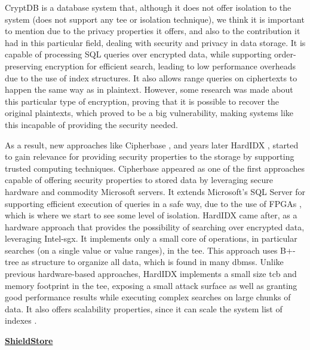 CryptDB \cite{cryptDBPaper} is a database system that, although it does not offer isolation to the system (does not support any \gls{tee} or isolation technique), we think it is important to mention due to the privacy properties it offers, and also to the contribution it had in this particular field, dealing with security and privacy in data storage.
It is capable of processing SQL queries over encrypted data, while supporting order-preserving encryption for efficient search, leading to low performance overheads due to the use of index structures. It also allows range queries on ciphertexts to happen the same way as in plaintext. However, some research  \cite{naveedPaper} was made about this particular type of encryption, proving that it is possible to recover the original plaintexts, which proved to be a big vulnerability, making systems like this incapable of providing the security needed.

As a result, new approaches like Cipherbase \cite{cipherbasePaper}, and years later HardIDX \cite{hardIDXPaper}, started to gain relevance for providing security properties to the storage by supporting trusted computing techniques.
Cipherbase appeared as one of the first approaches capable of offering security properties to stored data by leveraging secure hardware and commodity Microsoft servers. It extends Microsoft's SQL Server for supporting efficient execution of queries in a safe way, due to the use of FPGAs \cite{fpga}, which is where we start to see some level of isolation.
HardIDX came after, as a hardware approach that provides the possibility of searching over encrypted data, leveraging Intel-\gls{sgx}. It implements only a small core of operations, in particular searches (on a single value or value ranges), in the \gls{tee}.
This approach uses B+-tree as structure to organize all data, which is found in many \gls{dbms}s.
Unlike previous hardware-based approaches, HardIDX implements a small size \gls{tcb} and memory footprint in the \gls{tee}, exposing a small attack surface as well as granting good performance results while executing complex searches on large chunks of data. It also offers scalability properties, since it can scale the system list of indexes \cite{hardIDXPaper}.\newline


\underline{\textbf{ShieldStore}}

